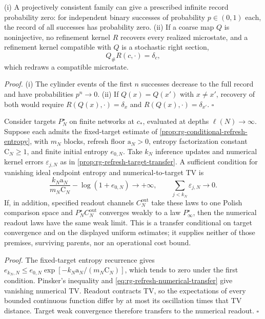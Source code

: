 (i) A projectively consistent family can give a prescribed infinite record
probability zero: for independent binary successes of probability
\(p\in(0,1)\) each, the record of all successes has probability zero. (ii) If
a coarse map \(Q\) is noninjective, no refinement kernel \(R\) recovers every
realized microstate, and a refinement kernel compatible with \(Q\) is a
stochastic right section,
\begin{equation}
Q_\#R(c,\cdot)=\delta_c,
\label{eq:rg-stochastic-right-section}
\end{equation}
which redraws a compatible microstate. 

\noindent\emph{Proof.}
(i) The cylinder events of the first \(n\) successes decrease to the full
record and have probabilities \(p^n\to0\). (ii) If \(Q(x)=Q(x')\) with
\(x\neq x'\), recovery of both would require
\(R(Q(x),\cdot)=\delta_x\) and \(R(Q(x),\cdot)=\delta_{x'}\). \(\square\)

Consider targets $P^\star_N$ on finite networks at $c_*$, evaluated at depths
$\ell(N)\to\infty$. Suppose each admits the fixed-target estimate of
\cref{prop:rg-conditional-refresh-entropy}, with $m_N$ blocks, refresh
floor $\mathrm a_N>0$, entropy factorization constant $\mathrm C_N\geq1$,
and finite initial entropy $e_{0,N}$. Take $k_N$ inference updates and
numerical kernel errors $\varepsilon_{j,N}$ as in
\cref{prop:rg-refresh-target-transfer}. A sufficient condition for vanishing
ideal endpoint entropy and numerical-to-target TV is
\begin{equation}
\frac{k_N\mathrm a_N}{m_N\mathrm C_N}-\log(1+e_{0,N})\longrightarrow+\infty,
\qquad
\sum_{j<k_N}\varepsilon_{j,N}\longrightarrow0.
\label{eq:rg-refresh-operational-diagonal}
\end{equation}
If, in addition, specified readout channels $C_N^{\mathrm{out}}$ take these laws to one
Polish comparison space and $P^\star_NC_N^{\mathrm{out}}$ converges weakly to a law
$P^\star_\infty$, then the numerical readout laws have the same weak limit.
This is a transfer conditional on target convergence and on the displayed
uniform estimates; it supplies neither of those premises, surviving
parents, nor an operational cost bound.

\noindent\emph{Proof.}
The fixed-target entropy recurrence gives
$e_{k_N,N}\leq e_{0,N}\exp[-k_N\mathrm a_N/(m_N\mathrm C_N)]$,
which tends to zero under the first condition. Pinsker's inequality and
\eqref{eq:rg-refresh-numerical-transfer} give vanishing numerical TV.
Readout contracts TV, so the expectations of every bounded continuous
function differ by at most its oscillation times that TV distance.
Target weak convergence therefore transfers to the numerical readout.
\hfill$\square$

